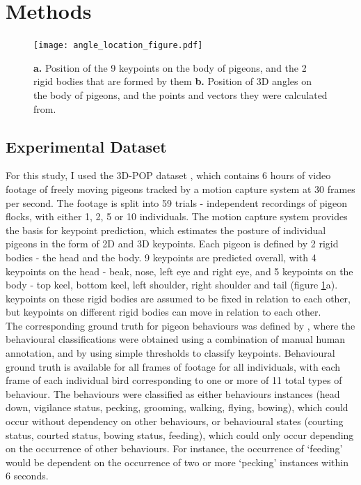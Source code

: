 \documentclass[11pt, letterpaper]{article} %
\begin{document}
    
    

\section{Methods}

    \begin{figure}
        \centering
        \texttt{[image: angle\_location\_figure.pdf]}
        \caption{\textbf{a.} Position of the 9 keypoints on the body of pigeons, and the 2 rigid bodies that are formed by them \textbf{b.} Position of 3D angles on the body of pigeons, and the points and vectors they were calculated from.}
        \label{fig:pigeon_kp}
    \end{figure}

    
    \subsection{Experimental Dataset}

    For this study, I used the 3D-POP dataset \citep{naik_3d-pop_2023}, which contains 6 hours of video footage of freely moving pigeons tracked by a motion capture system at 30 frames per second. The footage is split into 59 trials - independent recordings of pigeon flocks, with either 1, 2, 5 or 10 individuals. The motion capture system provides the basis for keypoint prediction, which estimates the posture of individual pigeons in the form of 2D and 3D keypoints.
    Each pigeon is defined by 2 rigid bodies - the head and the body. 9 keypoints are predicted overall, with 4 keypoints on the head - beak, nose, left eye and right eye, and 5 keypoints on the body - top keel, bottom keel, left shoulder, right shoulder and tail (figure \ref{fig:pigeon_kp}a). keypoints on these rigid bodies are assumed to be fixed in relation to each other, but keypoints on different rigid bodies can move in relation to each other. \\
    
    \noindent The corresponding ground truth for pigeon behaviours was defined by \citet{delacoux_fine-scale_2024}, where the behavioural classifications were obtained using a combination of manual human annotation, and by using simple thresholds to classify keypoints. Behavioural ground truth is available for all frames of footage for all individuals, with each frame of each individual bird corresponding to one or more of 11 total types of behaviour.
    The behaviours were classified as either behaviours instances (head down, vigilance status, pecking, grooming, walking, flying, bowing), which could occur without dependency on other behaviours, 
    or behavioural states (courting status, courted status, bowing status, feeding), which could only occur depending on the occurrence of other behaviours. For instance, the occurrence of `feeding' would be dependent on the occurrence of two or more `pecking' instances within 6 seconds.
\end{document}
